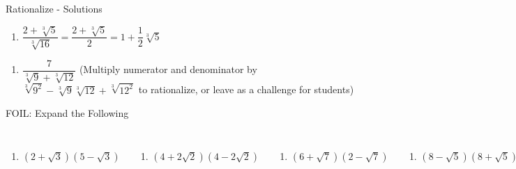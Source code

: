 \documentclass[aspectratio=169]{beamer}
\begin{document}
\begin{frame}{Rationalize - Solutions}
\begin{tcolorbox}[colback=lightgray,colframe=primary,title=Solutions]
\footnotesize
\begin{enumerate}[label=5\textbf{a})]
  \item $\dfrac{2+\sqrt[3]{5}}{\sqrt[3]{16}} = \dfrac{2+\sqrt[3]{5}}{2} = 1+\dfrac{1}{2}\sqrt[3]{5}$
\end{enumerate}
\begin{enumerate}[label=5\textbf{b})]
  \item $\dfrac{7}{\sqrt[3]{9}+\sqrt[3]{12}}$ (Multiply numerator and denominator by $\sqrt[3]{9^2}-\sqrt[3]{9}\sqrt[3]{12}+\sqrt[3]{12^2}$ to rationalize, or leave as a challenge for students)
\end{enumerate}
\end{tcolorbox}
\end{frame}

\begin{frame}{FOIL: Expand the Following}
\begin{tcolorbox}[colback=lightgray,colframe=accent,title=Practice Problems]
\footnotesize
\begin{columns}[T]
\begin{enumerate}[label=6\textbf{a})]
  \item $\left(2+\sqrt{3}\right)\left(5-\sqrt{3}\right)$
\end{enumerate}
\begin{enumerate}[label=6\textbf{b})]
  \item $\left(4+2\sqrt{2}\right)\left(4-2\sqrt{2}\right)$
\end{enumerate}
\begin{enumerate}[label=6\textbf{c})]
  \item $\left(6+\sqrt{7}\right)\left(2-\sqrt{7}\right)$
\end{enumerate}
\begin{enumerate}[label=6\textbf{d})]
  \item $\left(8-\sqrt{5}\right)\left(8+\sqrt{5}\right)$
\end{enumerate}
\end{columns}
\end{tcolorbox}
\end{frame}
\end{document}
